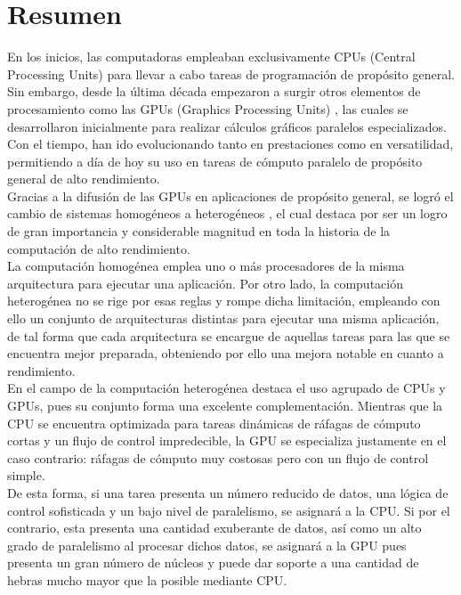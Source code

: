 \section{Resumen}
En los inicios, las computadoras empleaban exclusivamente CPUs (Central Processing Units) \cite{CPU_definicion} para llevar a cabo tareas de programación de propósito general. Sin embargo, desde la última década empezaron a surgir otros elementos de procesamiento como las GPUs (Graphics Processing Units) \cite{GPU_definicion}, las cuales se desarrollaron inicialmente para realizar cálculos gráficos paralelos especializados. Con el tiempo, han ido evolucionando tanto en prestaciones como en versatilidad, permitiendo a día de hoy su uso en tareas de cómputo paralelo de propósito general de alto rendimiento. \\
Gracias a la difusión de las GPUs en aplicaciones de propósito general, se logró el cambio de sistemas homogéneos a heterogéneos \cite{sitemas_heterogeneo_definicion}, el cual destaca por ser un logro de gran importancia y considerable magnitud en toda la historia de la computación de alto rendimiento. \\
La computación homogénea emplea uno o más procesadores de la misma arquitectura para ejecutar una aplicación. Por otro lado, la computación heterogénea no se rige por esas reglas y rompe dicha limitación, empleando con ello un conjunto de arquitecturas distintas para ejecutar una misma aplicación, de tal forma que cada arquitectura se encargue de aquellas tareas para las que se encuentra mejor preparada, obteniendo por ello una mejora notable en cuanto a rendimiento. \\
En el campo de la computación heterogénea destaca el uso agrupado de CPUs y GPUs, pues su conjunto forma una excelente complementación. Mientras que la CPU se encuentra optimizada para tareas dinámicas de ráfagas de cómputo cortas y un flujo de control impredecible, la GPU se especializa justamente en el caso contrario: ráfagas de cómputo muy costosas pero con un flujo de control simple. \\
De esta forma, si una tarea presenta un número reducido de datos, una lógica de control sofisticada y un bajo nivel de paralelismo, se asignará a la CPU. Si por el contrario, esta presenta una cantidad exuberante de datos, así como un alto grado de paralelismo al procesar dichos datos, se asignará a la GPU pues presenta un gran número de núcleos y puede dar soporte a una cantidad de hebras mucho mayor que la posible mediante CPU. \cite{Professional_CUDA_C} \\

